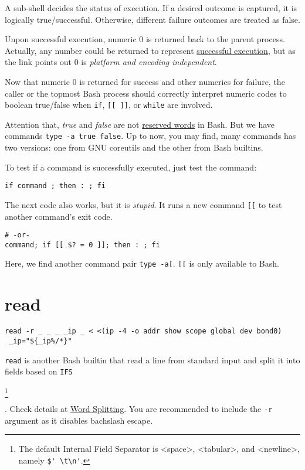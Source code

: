 A sub-shell decides the status of execution. If a desired
outcome is captured, it is logically true/successful. Otherwise,
different failure outcomes are treated as false.

Unpon successful execution, numeric 0 is returned back to the
parent process. Actually, any number could be returned to
represent
\href{https://stackoverflow.com/a/21439109/2336707}{successful
  execution}, but as the link points out 0 is \textit{platform and
  encoding independent}.

Now that numeric 0 is returned for success and other numerics for
failure, the caller or the topmost Bash process should correctly
interpret numeric codes to boolean true/false when \lstinline|if|,
\lstinline|[[ ]]|, or \lstinline|while| are involved.

Attention that, \textit{true} and \textit{false} are not
\href{https://www.gnu.org/software/bash/manual/html_node/Reserved-Word-Index.html}{reserved
  words} in Bash. But we have commands
\lstinline|type -a true false|. Up to now, you may find, many
commands has two versions: one from GNU coreutils and the other
from Bash builtins.

To test if a command is successfully executed, just test the command:

\begin{lstlisting}
if command ; then : ; fi
\end{lstlisting}

The next code also works, but it is \textit{stupid}. It runs a new
command \lstinline|[[| to test another command's exit code.

\begin{lstlisting}
# -or-
command; if [[ $? = 0 ]]; then : ; fi
\end{lstlisting}

Here, we find another command pair \lstinline|type -a[|.
\lstinline|[[| is only available to Bash.

\section{read}
\label{sec:bash-read}

\begin{lstlisting}
read -r _ _ _ _ip _ < <(ip -4 -o addr show scope global dev bond0)
 _ip="${_ip%/*}"
\end{lstlisting}

\lstinline|read| is another Bash builtin that read a line from
standard input and split it into fields based on \lstinline|IFS|
\begin{cprotect}
  \footnote{The default Internal Field Separator is <space>,
    <tabular>, and <newline>, namely \lstinline|$' \t\n'|.}
\end{cprotect}. Check details at
\href{https://www.gnu.org/software/bash/manual/bash.html#Word-Splitting}{Word
  Splitting}. You are recommended to include the \lstinline|-r|
argument as it disables bachslash escape.

